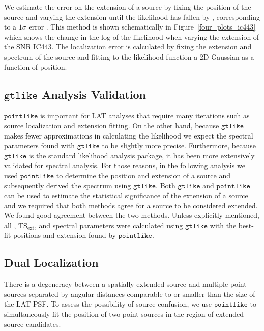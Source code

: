 \documentclass[12pt,preprint]{aastex}
\newcommand{\tsext}{{\ensuremath{\text{TS}_{\text{ext}}}}\xspace}
\newcommand{\ts}{\text{TS}\xspace}
\newcommand{\gtlike}{\ensuremath{\mathtt{gtlike}}\xspace}
\newcommand{\pointlike}{\ensuremath{\mathtt{pointlike}}\xspace}
\begin{document}
We estimate the error on the extension of a source by fixing
the position of the source and varying the extension until the
likelihood has fallen by \onehalf, corresponding to a $1\sigma$ error
\citep{Statistical_methods_book}.  This method is shown schematically in
Figure~\ref{four_plots_ic443} which shows the change in the log of the
likelihood when varying the extension of the SNR IC443.  The localization
error is calculated by fixing the extension and spectrum of the source
and fitting to the likelihood function a 2D Gaussian as a function
of position.

\subsection{\gtlike Analysis Validation}
\label{gtlike_crosscheck}

\pointlike is important for LAT analyses that require many iterations
such as source localization and extension fitting.  On the other hand,
because \gtlike makes fewer approximations in calculating the likelihood
we expect the spectral parameters found with \gtlike to be slightly more
precise.  Furthermore, because \gtlike is the standard likelihood analysis
package, it has been more extensively validated for spectral analysis.
For those reasons, in the following analysis we used \pointlike to
determine the position and extension of a source and subsequently derived
the spectrum using \gtlike. Both \gtlike and \pointlike can be used to
estimate the statistical significance of the extension of a source and we
required that both methods agree for a source to be considered extended.
We found good agreement between the two methods.  Unless explicitly
mentioned, all \ts, \tsext, and spectral parameters were calculated using
\gtlike with the best-fit positions and extension found by \pointlike.

\subsection{Dual Localization}
\label{dual_localization_method}

There is a degeneracy between a spatially extended source and multiple
point sources separated by angular distances comparable to or smaller than
the size of the LAT PSF.  To assess the possibility of source confusion,
we use \pointlike to simultaneously fit the position of two point sources
in the region of extended source candidates.
\end{document}
